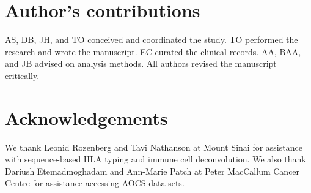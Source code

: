 \documentclass[linenumbers]{bmcart}
\begin{document}
\begin{backmatter}
\section*{Author's contributions}
 AS, DB, JH, and TO conceived and coordinated the study. TO performed the research and wrote the manuscript. EC curated the clinical records. AA, BAA, and JB advised on analysis methods.  All authors revised the manuscript critically.

\section*{Acknowledgements}
We thank Leonid Rozenberg and Tavi Nathanson at Mount Sinai for assistance with sequence-based HLA typing and immune cell deconvolution. We also thank Dariush Etemadmoghadam and Ann-Marie Patch at Peter MacCallum Cancer Centre for assistance accessing AOCS data sets.






\end{backmatter}
\end{document}
